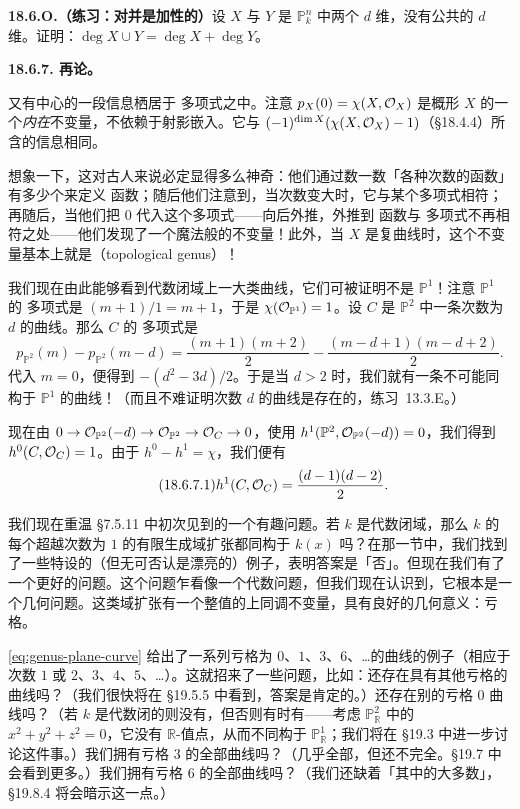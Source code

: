 \textbf{18.6.O.（练习：\trDegree{}对并是加性的）}\quad 设 $X$ 与 $Y$ 是 $\mathbb{P}^n_k$ 中两个 $d$ 维\trClosedSubscheme，没有公共的 $d$ 维\trIrreducibleComponent。证明：$\deg X\cup Y=\deg X+\deg Y$。

\textbf{18.6.7. 再论\trArithmeticGenus。}

又有中心的一段信息栖居于 \trHilbert{}多项式之中。注意 $p_X(0)=\chi(X,\mathcal{O}_X)$ 是概形 $X$ 的一个\emph{内在}不变量，不依赖于射影嵌入。它与\trArithmeticGenus{} $(-1)^{\dim X}(\chi(X,\mathcal{O}_X)-1)$（\S18.4.4）所含的信息相同。

想象一下，这对古人来说必定显得多么神奇：他们通过数一数「各种次数的函数」有多少个来定义 \trHilbert{}函数；随后他们注意到，当次数变大时，它与某个多项式相符；再随后，当他们把 $0$ 代入这个多项式——向后外推，外推到 \trHilbert{}函数与 \trHilbert{}多项式不再相符之处——他们发现了一个魔法般的不变量！此外，当 $X$ 是复曲线时，这个不变量基本上就是\trTopologicalGenus（topological genus）！

我们现在由此能够看到代数闭域上一大类曲线，它们可被证明不是 $\mathbb{P}^1$！注意 $\mathbb{P}^1$ 的 \trHilbert{}多项式是 $(m+1)/1=m+1$，于是 $\chi(\mathcal{O}_{\mathbb{P}^1})=1$。设 $C$ 是 $\mathbb{P}^2$ 中一条次数为 $d$ 的曲线。那么 $C$ 的 \trHilbert{}多项式是
\[
p_{\mathbb{P}^2}(m)-p_{\mathbb{P}^2}(m-d)=\frac{(m+1)(m+2)}{2}-\frac{(m-d+1)(m-d+2)}{2}.
\]
代入 $m=0$，便得到 $-(d^2-3d)/2$。于是当 $d>2$ 时，我们就有一条不可能同构于 $\mathbb{P}^1$ 的曲线！（而且不难证明次数 $d$ 的\trRegular{}曲线是存在的，\mbox{练习~13.3.E}。）

现在由 $0\to\mathcal{O}_{\mathbb{P}^2}(-d)\to\mathcal{O}_{\mathbb{P}^2}\to\mathcal{O}_C\to 0$，使用 $h^1(\mathbb{P}^2,\mathcal{O}_{\mathbb{P}^2}(-d))=0$，我们得到 $h^0(C,\mathcal{O}_C)=1$。由于 $h^0-h^1=\chi$，我们便有
\begin{equation*}\tag{18.6.7.1}\label{eq:genus-plane-curve}
h^1(C,\mathcal{O}_C)=\frac{(d-1)(d-2)}{2}.
\end{equation*}

我们现在重温 \S7.5.11 中初次见到的一个有趣问题。若 $k$ 是代数闭域，那么 $k$ 的每个超越次数为 $1$ 的有限生成域扩张都同构于 $k(x)$ 吗？在那一节中，我们找到了一些特设的（但无可否认是漂亮的）例子，表明答案是「否」。但现在我们有了一个更好的问题。这个问题乍看像一个代数问题，但我们现在认识到，它根本是一个几何问题。这类域扩张有一个整值的上同调不变量，具有良好的几何意义：亏格。

\eqref{eq:genus-plane-curve} 给出了一系列亏格为 $0$、$1$、$3$、$6$、\dots{}的曲线的例子（相应于次数 $1$ 或 $2$、$3$、$4$、$5$、\dots）。这就招来了一些问题，比如：还存在具有其他亏格的曲线吗？（我们很快将在 \S19.5.5 中看到，答案是肯定的。）还存在别的亏格 $0$ 曲线吗？（若 $k$ 是代数闭的则没有，但否则有时有——考虑 $\mathbb{P}^2_\mathbb{R}$ 中的 $x^2+y^2+z^2=0$，它没有 $\mathbb{R}$-值点，从而不同构于 $\mathbb{P}^1_\mathbb{R}$；我们将在 \S19.3 中进一步讨论这件事。）我们拥有亏格 $3$ 的全部曲线吗？（几乎全部，但还不完全。\S19.7 中会看到更多。）我们拥有亏格 $6$ 的全部曲线吗？（我们还缺着「其中的大多数」，\S19.8.4 将会暗示这一点。）

